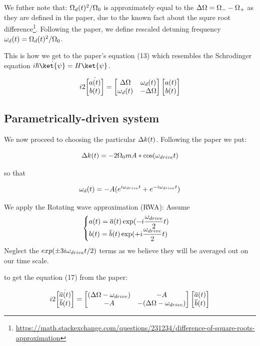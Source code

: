 We futher note that:
\ls $\Omega_d(t)^2/\Omega_0$ is approximately equal to the $\Delta\Omega = \Omega_{-} - \Omega_{+}$ as they are defined in the
paper, due to the known fact about the squre root
difference\footnote{\url{https://math.stackexchange.com/questions/231234/difference-of-square-roots-approximation}}.
\li Following the paper, we define rescaled detuning frequency $\omega_d(t) = \Omega_d(t)^2/\Omega_0$.
\le

This is how we get to the paper's equation (13) which resembles the Schrodinger equation
\(i\hbar\dot{\ket{\psi}} = H\ket{\psi}\).

\begin{equation}
i2
\dot{\begin{bmatrix}
  a(t) \\
  b(t)
\end{bmatrix}}
=
\begin{bmatrix}
  \Delta\Omega & \omega_d(t) \\
  \omega_d(t) & -\Delta\Omega
\end{bmatrix}
\begin{bmatrix}
  a(t) \\
  b(t)
\end{bmatrix}
\label{normalamp}
\end{equation}

\subsection{Parametrically-driven system}

We now proceed to choosing the particular $\Delta k(t)$. Following the paper we put:

\[
  \Delta k(t) = -2 \Omega_0 m A * \cos(\omega_{drive} t)
\]

so that

\[
  \omega_d(t) = -A (e^{i \omega_{drive} t} + e^{-i \omega_{drive} t})
\]

We apply the Rotating wave approximation (RWA):
\ls Assume
    \[
      \begin{cases}
      \displaystyle a(t) = \overline{a}(t) \exp(-i\frac{\omega_{drive}}{2}t) \\
      \displaystyle b(t) = \overline{b}(t) \exp(+i\frac{\omega_{drive}}{2}t)
      \end{cases}
    \]
\li Neglect the $exp(\pm3i\omega_{drive} t/2)$ terms as we believe they will be averaged out on our time
    scale.
\le

to get the equation (17) from the paper:


\begin{equation}
i2
\dot{\begin{bmatrix}
  \overline{a}(t) \\
  \overline{b}(t)
\end{bmatrix}}
=
\begin{bmatrix}
  (\Delta\Omega - \omega_{drive}) & -A \\
  -A & -(\Delta\Omega - \omega_{drive})
\end{bmatrix}
\begin{bmatrix}
  \overline{a}(t) \\
  \overline{b}(t)
\end{bmatrix}
\label{rotamp}
\end{equation}

